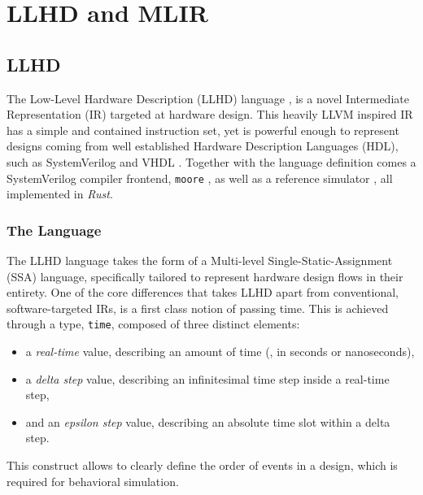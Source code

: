 \chapter{LLHD and MLIR}
\label{ch:ir}


\section{LLHD}
\label{section:llhd}
The Low-Level Hardware Description (LLHD) language \cite{Schuiki2020, llhd.io}, is a novel Intermediate Representation (IR) targeted at hardware design. This heavily LLVM inspired IR has a simple and contained instruction set, yet is powerful enough to represent designs coming from well established Hardware Description Languages (HDL), such as SystemVerilog \cite{SV2018} and VHDL \cite{VHDL2009}. Together with the language definition comes a SystemVerilog compiler frontend, \texttt{moore} \cite{moore}, as well as a reference simulator \cite{llhd-sim}, all implemented in \textit{Rust}.


\subsection{The Language}
The LLHD language takes the form of a Multi-level Single-Static-Assignment (SSA) \cite{Alpern1988} language, specifically tailored to represent hardware design flows in their entirety.
One of the core differences that takes LLHD apart from conventional, software-targeted IRs, is a first class notion of passing time. This is achieved through a type, \texttt{time}, composed of three distinct elements:

\begin{itemize}
    \item a \textit{real-time} value, describing an amount of time (\eg, in seconds or nanoseconds),
    \item a \textit{delta step} value, describing an infinitesimal time step inside a real-time step,
    \item and an \textit{epsilon step} value, describing an absolute time slot within a delta step.
\end{itemize}

This construct allows to clearly define the order of events in a design, which is required for behavioral simulation.

